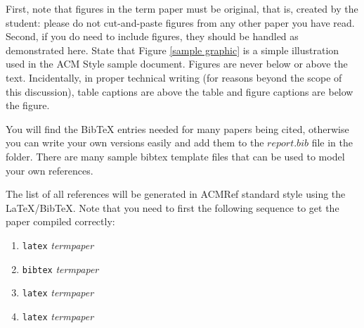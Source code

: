 \documentclass{sig-alternate}
\begin{document}
First, note that figures in the term paper must be original,
that is, created by the student: please do not cut-and-paste
figures from any other paper you have read. Second, if you
do need to include figures, they should be handled as
demonstrated here. State that Figure \ref{sample graphic} is
a simple illustration used in the ACM Style sample
document. Figures are never below or above the
text. Incidentally, in proper technical writing (for reasons
beyond the scope of this discussion), table captions are
above the table and figure captions are below the figure.

You will find the BibTeX entries needed for many papers being cited,
otherwise you can write your own versions easily and add them to the
$report.bib$ file in the folder. There are many sample bibtex
template files that can be used to model your own references.

The list of all references will be generated in ACMRef
standard style using the \LaTeX{}/BibTeX. Note that you
need to first the following sequence to get the paper
compiled correctly:

\begin{enumerate}
\item {\tt latex} {\em termpaper}
\item {\tt bibtex} {\em termpaper}
\item {\tt latex} {\em termpaper}
\item {\tt latex} {\em termpaper}
\end{enumerate}



\balance
\end{document}
